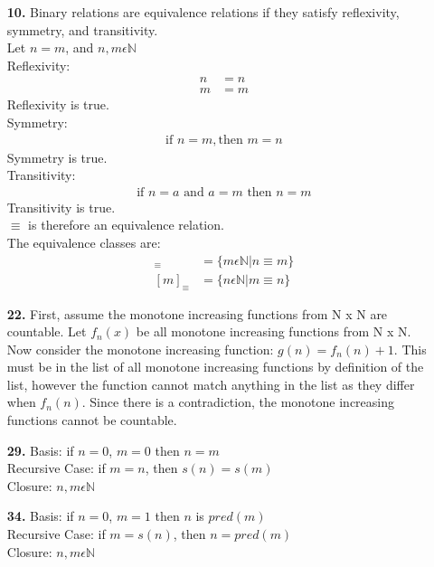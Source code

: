 \documentclass[]{article}
\begin{document}
\begin{flushleft}
\begin{enumerate}
\item [\textbf{10.}] Binary relations are equivalence relations if they satisfy reflexivity, symmetry, and transitivity.\\
\bigskip
Let $n=m$, and $n,m\epsilon \mathbb{N}$\\
\bigskip
Reflexivity:
\begin{align*}
n&=n\\
m&=m
\end{align*}
Reflexivity is true.\\
Symmetry:
\begin{align*}
\text{if } n=m, \text{then }m=n
\end{align*}
Symmetry is true.\\
Transitivity:
\begin{align*}
\text{if } n=a \text{ and } a=m \text{ then } n=m
\end{align*}
Transitivity is true.\\
$\equiv$ is therefore an equivalence relation.\\
The equivalence classes are:
\begin{align*}
	[n]_{\equiv}  &= \{m\epsilon\mathbb{N}|n\equiv m\}\\
	[m]_{\equiv}  &= \{n\epsilon\mathbb{N}|m\equiv n\}
\end{align*}

\item [\textbf{22.}] First, assume the monotone increasing functions from N x N are countable. Let $f_{n}(x)$ be all monotone increasing functions from N x N. \\
\medskip
Now consider the monotone increasing function: $g(n) = f_n(n)+1$. This must be in the list of all monotone increasing functions by definition of the list, however the function cannot match anything in the list as they differ when $f_n(n)$. Since there is a contradiction, the monotone increasing functions cannot be countable.

\item[\textbf{29.}]Basis: if $n=0$, $m=0$ then $n=m$\\
Recursive Case: if $m = n$, then $s(n) = s(m)$\\
Closure: $n,m \epsilon \mathbb{N}$\\

\item[\textbf{34.}] Basis: if $n=0$, $m=1$ then $n$ is $pred(m)$\\
Recursive Case: if $m = s(n)$, then $n =pred(m)$\\
Closure: $n,m \epsilon \mathbb{N}$\\
\newpage


\end{enumerate}
\end{flushleft}
\end{document}

